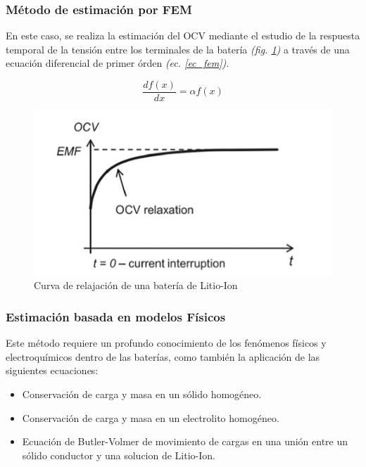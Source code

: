 \documentclass[10pt]{beamer}
\theoremstyle{remark}
\theoremstyle{definition}
\begin{document}
\begin{frame}[allowframebreaks]
	\frametitle{Método de estimación por FEM}
  	En este caso, se realiza la estimación del OCV mediante el estudio de la
 	 respuesta temporal de la tensión entre los terminales de la batería
  	\emph{(fig. \ref{fig:relax_emf})} a través
  	de una ecuación diferencial de primer órden \emph{(ec. \ref{ec_fem})}.
  	\begin{minipage}{0.4\textwidth}
		\centering
		\begin{equation}
	  		\frac{df(x)}{dx} = \alpha f(x)
	  		\label{ec_fem}
		\end{equation}
  	\end{minipage}
  	\hspace{10pt}
  	\begin{minipage}{0.4\textwidth}
		\begin{figure}[h!]
	  		\includegraphics[width=1\textwidth]{images/EMF_relaxation.png}
	  		\caption{Curva de relajación de una batería de Litio-Ion}
	  		\label{fig:relax_emf}
		\end{figure}
  	\end{minipage}
\end{frame}

\begin{frame}[allowframebreaks]
	\frametitle{Estimación basada en modelos Físicos}
  	Este método requiere un profundo conocimiento de los fenómenos físicos y
  	electroquímicos dentro de las baterías, como también la aplicación de las
  	siguientes ecuaciones:
  	\begin{itemize}
		\item 	Conservación de carga y masa en un sólido homogéneo.
		\item 	Conservación de carga y masa en un electrolito homogéneo.
		\item 	Ecuación de Butler-Volmer de movimiento de cargas en una unión entre
	 			un sólido conductor y una solucion de Litio-Ion.
  	\end{itemize}
\end{frame}
\end{document}
